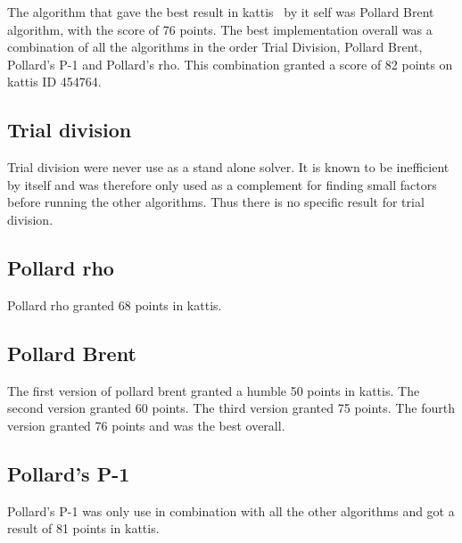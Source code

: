 The algorithm that gave the best result in kattis~\cite{kattis} by it self was Pollard Brent algorithm, with the score of 76 points. The best implementation overall was a combination of all the algorithms in the order Trial Division, Pollard Brent, Pollard’s P-1 and Pollard’s rho. This combination granted a score of 82 points on kattis ID 454764.

\subsection{Trial division}

Trial division were never use as a stand alone solver. It is known to be inefficient by itself and was therefore only used as a complement for finding small factors before running the other algorithms. Thus there is no specific result for trial division.

\subsection{Pollard rho}

Pollard rho granted 68 points in kattis.

\subsection{Pollard Brent}

The first version of pollard brent granted a humble 50 points in kattis. The second version granted 60 points. The third version granted 75 points. The fourth version granted 76 points and was the best overall.

\subsection{Pollard's P-1}

Pollard’s P-1 was only use in combination with all the other algorithms and got a result of 81 points in kattis.

